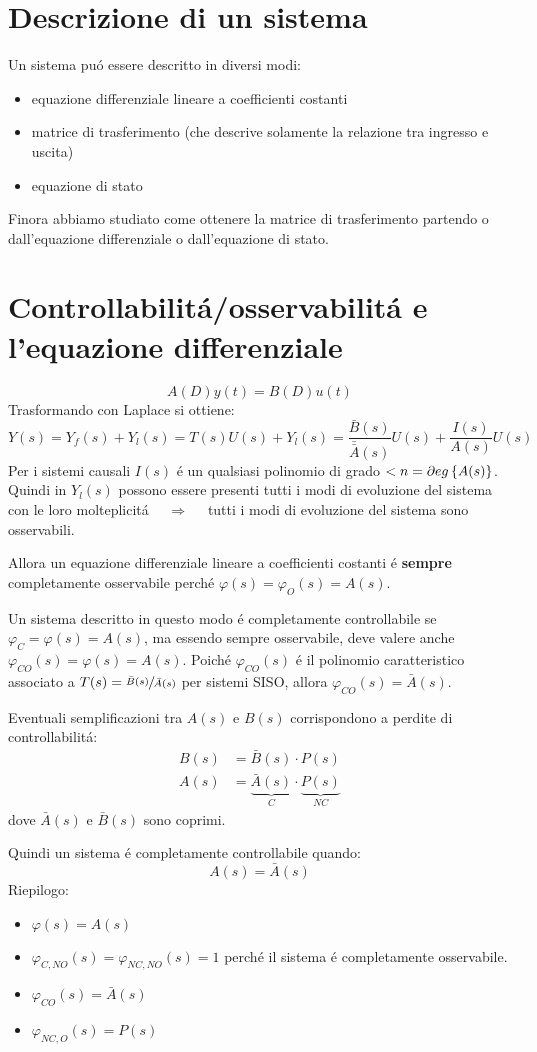\documentclass[../main.tex]{subfiles}
\begin{document}
	\section{Descrizione di un sistema}
	Un sistema pu\'o essere descritto in diversi modi:
	\begin{itemize}
		\item 
			equazione differenziale lineare a coefficienti costanti
		\item 
			matrice di trasferimento (che descrive solamente la relazione tra ingresso e uscita)
		\item 
			equazione di stato
	\end{itemize}
	
	Finora abbiamo studiato come ottenere la matrice di trasferimento partendo o dall'equazione differenziale o dall'equazione di stato.
	
	\section{Controllabilit\'a/osservabilit\'a e l'equazione differenziale}
		\[
			A(D)y(t) = B(D)u(t)
		\]
		Trasformando con Laplace si ottiene:
		\[
			Y(s) = Y_f(s) + Y_l(s) = T(s)U(s) + Y_l(s) = \dfrac{\bar B(s)}{\bar{\bar{A}}(s)} U(s) + \dfrac{I(s)}{A(s)} U(s)
		\]
		Per i sistemi causali $ I(s) $ \'e un qualsiasi polinomio di grado $ < n = \partial eg \left\lbrace A(s) \right\rbrace $. Quindi in $ Y_l(s) $ possono essere presenti tutti i modi di evoluzione del sistema con le loro molteplicit\'a $ \quad\Rightarrow\quad $ tutti i modi di evoluzione del sistema sono osservabili.
		
		Allora un equazione differenziale lineare a coefficienti costanti \'e \textbf{sempre} completamente osservabile perch\'e $ \varphi(s) = \varphi_O(s) = A(s) $.
		
		Un sistema descritto in questo modo \'e completamente controllabile se $ \varphi_C = \varphi(s) = A(s) $, ma essendo sempre osservabile, deve valere anche  $ \varphi_{CO}(s) = \varphi(s) = A(s) $. Poich\'e $ \varphi_{CO}(s) $ \'e il polinomio caratteristico associato a $ T(s) = \sfrac{\bar B(s)}{\bar A(s)} $ per sistemi SISO, allora $ \varphi_{CO}(s) = \bar A(s) $.
		
		Eventuali semplificazioni tra $ A(s) $ e $ B(s) $ corrispondono a perdite di controllabilit\'a:
		\begin{align*}
			B(s) &= \bar B(s) \cdot P(s)\\
			A(s) &= \underbrace{\bar{A}(s)}_{C} \cdot \underbrace{P(s)}_{NC}
		\end{align*}
		dove $ \bar A(s) $ e $ \bar B(s) $ sono coprimi.
		
		Quindi un sistema \'e completamente controllabile quando: 
		\[
			A(s) = \bar A(s)
		\]
		\newline
		Riepilogo:
		\begin{itemize}
			\item $ \varphi(s) = A(s) $
			\item $ \varphi_{C,NO}(s) = \varphi_{NC,NO}(s) = 1 $ perch\'e il sistema \'e completamente osservabile.
			\item $ \varphi_{CO}(s) = \bar A(s) $
			\item $ \varphi_{NC,O}(s) = P(s) $
		\end{itemize}
\end{document}
